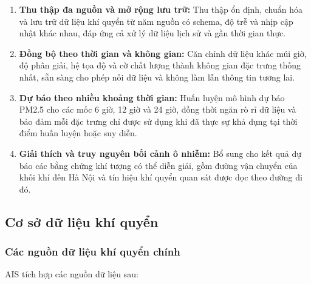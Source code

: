\documentclass[12pt,a4paper]{article}
\begin{document}
\begin{enumerate}
\def\labelenumi{\arabic{enumi}.}
\item
  \textbf{Thu thập đa nguồn và mở rộng lưu trữ:} Thu thập ổn định, chuẩn hóa và lưu trữ dữ liệu khí quyển từ năm nguồn có schema, độ trễ và nhịp cập nhật khác nhau, đáp ứng cả xử lý dữ liệu lịch sử và gần thời gian thực.
\item
  \textbf{Đồng bộ theo thời gian và không gian:} Căn chỉnh dữ liệu khác múi giờ, độ phân giải, hệ tọa độ và cờ chất lượng thành không gian đặc trưng thống nhất, sẵn sàng cho phép nối dữ liệu và không làm lẫn thông tin tương lai.
\item
  \textbf{Dự báo theo nhiều khoảng thời gian:} Huấn luyện mô hình dự báo PM2.5 cho các mốc 6 giờ, 12 giờ và 24 giờ, đồng thời ngăn rò rỉ dữ liệu và bảo đảm mỗi đặc trưng chỉ được sử dụng khi đã thực sự khả dụng tại thời điểm huấn luyện hoặc suy diễn.
\item
  \textbf{Giải thích và truy nguyên bối cảnh ô nhiễm:} Bổ sung cho kết quả dự báo các bằng chứng khí tượng có thể diễn giải, gồm đường vận chuyển của khối khí đến Hà Nội và tín hiệu khí quyển quan sát được dọc theo đường đi đó.
\end{enumerate}

\subsection{Cơ sở dữ liệu khí quyển}\label{cux1a1-sux1edf-dux1eef-liux1ec7u-khuxed-quyux1ec3n}

\subsubsection{Các nguồn dữ liệu khí quyển chính}\label{cuxe1c-nguux1ed3n-dux1eef-liux1ec7u-khuxed-quyux1ec3n-chuxednh}

AIS tích hợp các nguồn dữ liệu sau:
\end{document}
